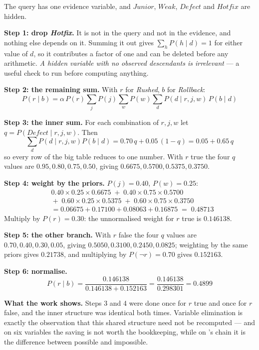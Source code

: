 \begin{worked}
The query has one evidence variable, and $\mathit{Junior}$, $\mathit{Weak}$,
$\mathit{Defect}$ and $\mathit{Hotfix}$ are hidden.

\smallskip
\textbf{Step 1: drop \emph{Hotfix}.} It is not in the query and not in the
evidence, and nothing else depends on it. Summing it out gives
$\sum_{h} P(h \mid d) = 1$ for either value of $d$, so it contributes a factor of
one and can be deleted before any arithmetic. \emph{A hidden variable with no
observed descendants is irrelevant} --- a useful check to run before computing
anything.

\smallskip
\textbf{Step 2: the remaining sum.} With $r$ for \emph{Rushed}, $b$ for
\emph{Rollback}:
\[
  P(r \mid b) = \alpha\, P(r) \sum_{j} P(j) \sum_{w} P(w) \sum_{d}
  P(d \mid r,j,w)\, P(b \mid d)
\]

\textbf{Step 3: the inner sum.} For each combination of $r, j, w$ let
$q = P(\mathit{Defect} \mid r,j,w)$. Then
\[
  \sum_{d} P(d \mid r,j,w) P(b \mid d) = 0.70\,q + 0.05\,(1-q)
  = 0.05 + 0.65\,q
\]
so every row of the big table reduces to one number. With $r$ true the four $q$
values are $0.95, 0.80, 0.75, 0.50$, giving $0.6675, 0.5700, 0.5375, 0.3750$.

\smallskip
\textbf{Step 4: weight by the priors.} $P(j) = 0.40$, $P(w) = 0.25$:
\begin{align*}
  &0.40 \times 0.25 \times 0.6675 \;+\; 0.40 \times 0.75 \times 0.5700 \\
  &{}+\; 0.60 \times 0.25 \times 0.5375 \;+\; 0.60 \times 0.75 \times 0.3750 \\
  &= 0.06675 + 0.17100 + 0.08063 + 0.16875 \;=\; 0.48713
\end{align*}
Multiply by $P(r) = 0.30$: the unnormalised weight for $r$ true is $0.146138$.

\smallskip
\textbf{Step 5: the other branch.} With $r$ false the four $q$ values are
$0.70, 0.40, 0.30, 0.05$, giving $0.5050, 0.3100, 0.2450, 0.0825$; weighting by the
same priors gives $0.21738$, and multiplying by $P(\neg r) = 0.70$ gives
$0.152163$.

\smallskip
\textbf{Step 6: normalise.}
\[
  P(r \mid b) = \frac{0.146138}{0.146138 + 0.152163}
  = \frac{0.146138}{0.298301} = 0.4899
\]

\smallskip
\textbf{What the work shows.} Steps 3 and 4 were done once for $r$ true and once
for $r$ false, and the inner structure was identical both times. Variable
elimination is exactly the observation that this shared structure need not be
recomputed --- and on six variables the saving is not worth the bookkeeping, while
on 's chain it is the difference between possible and impossible.
\end{worked}

